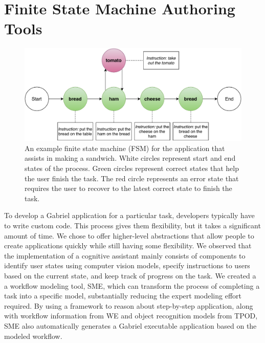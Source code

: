 \section{Finite State Machine Authoring Tools}
\label{sec: app-dev-statemachine}

\begin{figure}[t]
    \includegraphics[width=\linewidth]{FIGS/state_transition_4.pdf}
    \caption{An example finite state machine (FSM) for the application that assists in making a sandwich. White circles represent start and end states of the process. Green circles represent correct states that help the user finish the task. The red circle represents an error state that requires the user to recover to the latest correct state to finish the task.}
    \label{fig:sme}
\end{figure}

To develop a Gabriel application for a particular task, developers typically have to write custom code. This process gives them flexibility, but it takes a significant amount of time.
We chose to offer higher-level abstractions that allow people to
create applications quickly while still having some flexibility. We
observed that the implementation of a cognitive
assistant mainly consists of components to identify user states using computer
vision models, specify instructions to users based on the current state, and
keep track of progress on the task. We created a 
a workflow modeling tool, SME, which can transform
the process of completing a task into a specific model, substantially reducing the expert modeling effort required. By using a framework to reason about step-by-step application, along with workflow information from WE and object recognition models from TPOD, SME also automatically generates a Gabriel executable application based on the modeled workflow.


